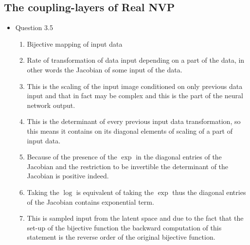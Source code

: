 \documentclass{article}
\begin{document}
      \subsection{The coupling-layers of Real NVP}
        \begin{itemize}
          \item Question 3.5
          \begin{enumerate}
            \item Bijective mapping of input data
            \item Rate of transformation of data input depending on  a part of the data, in other words the Jacobian of some input of the data.
            \item This is the scaling of the input image conditioned on only previous data input and that in fact may be complex and this is the part of the neural network output.
            \item This is the determinant of every previous input data transformation, so this means it contains on its diagonal elements of scaling of a part of input data. 
            \item Because of the presence of the $\exp$ in the diagonal entries of the Jacobian and the restriction to be invertible the determinant of the Jacobian is positive indeed. 
            \item Taking the $\log$ is equivalent of taking the $\exp$ thus the diagonal entries of the Jacobian contains exponential term. 
            \item This is sampled input from the latent space and due to the fact that the set-up of the bijective function the backward computation of this statement is the reverse order of the original bijective function. 
          \end{enumerate}
        \end{itemize}
\end{document}
